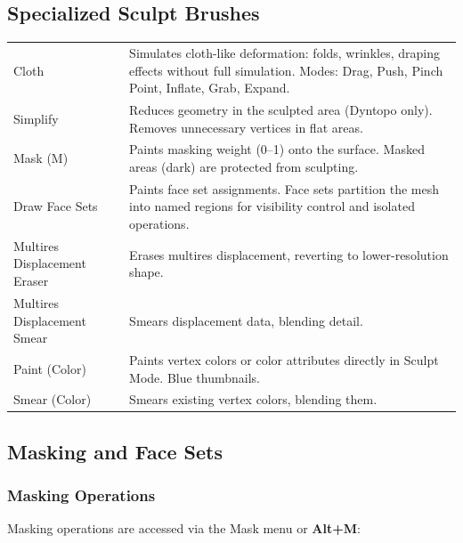 \subsection{Specialized Sculpt Brushes}
\label{sec:specialbrushes}

\begin{center}
\begin{tabularx}{\textwidth}{L{3.5cm}X}
\toprule
{}
 &  \\
\midrule
Cloth & Simulates cloth-like deformation: folds, wrinkles, draping effects without full simulation. Modes: Drag, Push, Pinch Point, Inflate, Grab, Expand. \\
Simplify & Reduces geometry in the sculpted area (Dyntopo only). Removes unnecessary vertices in flat areas. \\
Mask (M) & Paints masking weight (0--1) onto the surface. Masked areas (dark) are protected from sculpting. \\
Draw Face Sets & Paints face set assignments. Face sets partition the mesh into named regions for visibility control and isolated operations. \\
Multires Displacement Eraser & Erases multires displacement, reverting to lower-resolution shape. \\
Multires Displacement Smear & Smears displacement data, blending detail. \\
Paint (Color) & Paints vertex colors or color attributes directly in Sculpt Mode. Blue thumbnails. \\
Smear (Color) & Smears existing vertex colors, blending them. \\
\bottomrule
\end{tabularx}
\end{center}

\subsection{Masking and Face Sets}
\label{sec:masking}

\subsubsection{Masking Operations}

Masking operations are accessed via the Mask menu or \textbf{Alt+M}:

